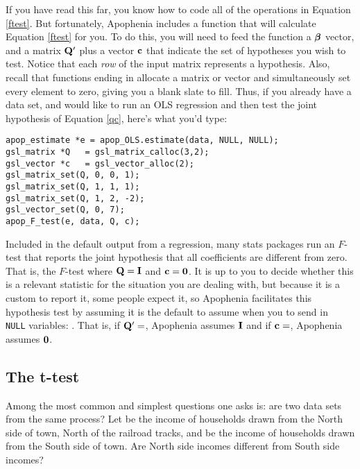 If you have read this far, you know how to code all of the operations
in Equation \ref{ftest}.  But fortunately, 
Apophenia includes a function that will calculate Equation \ref{ftest}
for you.
To do this, you will need to feed the function a ${\mbox{\boldmath$\beta$}}$ vector, and a
matrix ${\bf Q}'$ plus a vector ${\bf c}$ that indicate the set of hypotheses
you wish to test. Notice that each {\em row} of the input matrix represents a
hypothesis. Also, recall that functions ending in  allocate
a matrix or vector and simultaneously set every element to zero, giving
you a blank slate to fill. Thus, if you already have a data set, and
would like to run an OLS regression and then test the joint hypothesis
of Equation \ref{qc}, here's what you'd type:
\begin{lstlisting}
apop_estimate *e = apop_OLS.estimate(data, NULL, NULL);
gsl_matrix *Q   = gsl_matrix_calloc(3,2);
gsl_vector *c   = gsl_vector_alloc(2);
gsl_matrix_set(Q, 0, 0, 1);
gsl_matrix_set(Q, 1, 1, 1);
gsl_matrix_set(Q, 1, 2, -2);
gsl_vector_set(Q, 0, 7);
apop_F_test(e, data, Q, c);
\end{lstlisting}

Included in the default output from a regression,
many stats packages run an $F$-test that reports the
joint hypothesis that all coefficients are different from zero. That is,
the $F$-test where ${\bf Q} = {\bf I}$ and ${\bf c} = {\bf 0}$. It is up to you
to decide whether this is a relevant statistic for the situation you are
dealing with, but because it is a custom to report it, some people expect it,
so
Apophenia facilitates this hypothesis test by assuming it is the default to assume when you to send in {\tt
NULL} variables: . That is, if
${\bf Q}'=$, Apophenia assumes ${\bf I}$ and if ${\bf c}=$,
Apophenia assumes ${\bf 0}$.





\subsection{The t-test} \label{ttest}
Among the most common and simplest questions one asks is: are two data
sets from the same process? Let  be the income of households
drawn from the North side of town, North of the railroad tracks, and
 be the income of households drawn from the South side of
town. Are North side incomes different from South side incomes? 

